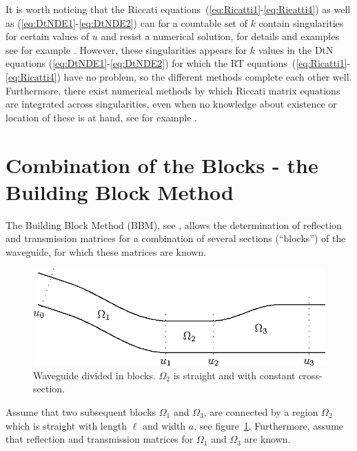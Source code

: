 \documentclass[numreferences]{kluwer}
\begin{document}
It is worth noticing that the Riccati
equations~(\ref{eq:Ricatti1}-\ref{eq:Ricatti4}) as well as
(\ref{eq:DtNDE1}-\ref{eq:DtNDE2}) can for a countable set of $k$
contain singularities for certain values of $u$ and resist a numerical
solution, for details and examples see for example
\cite{Fishman:1998}. However, these singularities appears for
$k$ values in the DtN equations (\ref{eq:DtNDE1}-\ref{eq:DtNDE2}) for
which the RT equations~(\ref{eq:Ricatti1}-\ref{eq:Ricatti4}) have no
problem, so the different methods complete each other
well. Furthermore, there exist numerical methods by which Riccati
matrix equations are integrated across singularities, even when no
knowledge about existence or location of these is at hand, see for
example \cite{Li-Kahan:2012}.


\section{Combination of the Blocks - the Building
Block Method}
\label{sec:comb-blocks-build}

The Building Block Method (BBM), see \cite{nilssonbrander1981b},
allows the determination of reflection and transmission matrices for
a combination of several sections (``blocks'') of the waveguide, for
which these matrices are known.

\begin{figure}[htb]
  \centering
  \includegraphics[width=\textwidth]{BBMwg-1}
  \caption{Waveguide divided in blocks. $\Omega_2$ is straight and
    with constant cross-section.}
  \label{fig:wg4}
\end{figure}


Assume that two subsequent blocks $\Omega_1$ and $\Omega_3$, are
connected by a region $\Omega_2$ which is straight with length $\ell$ and width $a$, see figure~\ref{fig:wg4}.  Furthermore, assume that
reflection and transmission matrices for $\Omega_1$
and $\Omega_3$ are known.
\end{document}
